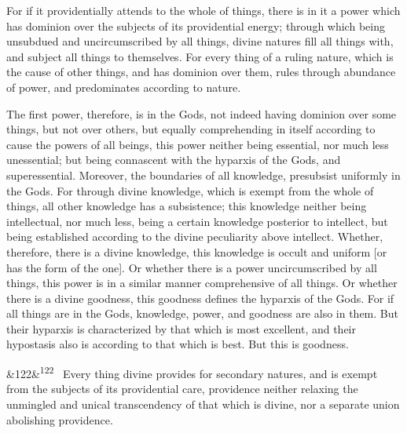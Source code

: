 \documentclass[12pt]{article}
\newcommand{\para}[1][]{\par\noindent\ifx&#1&\else\textsuperscript{\footnotesize #1}~\fi}
\begin{document}
For if it providentially attends to the whole of things, there is in it a power which has dominion over the subjects of its providential energy; through which being unsubdued and uncircumscribed by all things, divine natures fill all things with, and subject all things to themselves. For every thing of a ruling nature, which is the cause of other things, and has dominion over them, rules through abundance of power, and predominates according to nature.

The first power, therefore, is in the Gods, not indeed having dominion over some things, but not over others, but equally comprehending in itself according to cause the powers of all beings, this power neither being essential, nor much less unessential; but being connascent with the hyparxis of the Gods, and superessential. Moreover, the boundaries of all knowledge, presubsist uniformly in the Gods. For through divine knowledge, which is exempt from the whole of things, all other knowledge has a subsistence; this knowledge neither being intellectual, nor much less, being a certain knowledge posterior to intellect, but being established according to the divine peculiarity above intellect. Whether, therefore, there is a divine knowledge, this knowledge is occult and uniform [or has the form of the one]. Or whether there is a power uncircumscribed by all things, this power is in a similar manner comprehensive of all things. Or whether there is a divine goodness, this goodness defines the hyparxis of the Gods. For if all things are in the Gods, knowledge, power, and goodness are also in them. But their hyparxis is characterized by that which is most excellent, and their hypostasis also is according to that which is best. But this is goodness.

\para[122] Every thing divine provides for secondary natures, and is exempt from the subjects of its providential care, providence neither relaxing the unmingled and unical transcendency of that which is divine, nor a separate union abolishing providence.
\end{document}
